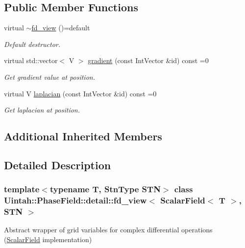 \subsection*{Public Member Functions}
\begin{DoxyCompactItemize}
\item 
virtual \hyperlink{classUintah_1_1PhaseField_1_1detail_1_1fd__view_3_01ScalarField_3_01T_01_4_00_01STN_01_4_ae0c8252279c942f0732dd858662f045f}{$\sim$fd\+\_\+view} ()=default
\begin{DoxyCompactList}\small\item\em Default destructor. \end{DoxyCompactList}\item 
virtual std\+::vector$<$ V $>$ \hyperlink{classUintah_1_1PhaseField_1_1detail_1_1fd__view_3_01ScalarField_3_01T_01_4_00_01STN_01_4_a5f8aa629d4cfae6641941946ff1d8aad}{gradient} (const Int\+Vector \&id) const =0
\begin{DoxyCompactList}\small\item\em Get gradient value at position. \end{DoxyCompactList}\item 
virtual V \hyperlink{classUintah_1_1PhaseField_1_1detail_1_1fd__view_3_01ScalarField_3_01T_01_4_00_01STN_01_4_a553675ea0c01e201769674a30333d56a}{laplacian} (const Int\+Vector \&id) const =0
\begin{DoxyCompactList}\small\item\em Get laplacian at position. \end{DoxyCompactList}\end{DoxyCompactItemize}
\subsection*{Additional Inherited Members}


\subsection{Detailed Description}
\subsubsection*{template$<$typename T, Stn\+Type S\+TN$>$\newline
class Uintah\+::\+Phase\+Field\+::detail\+::fd\+\_\+view$<$ Scalar\+Field$<$ T $>$, S\+T\+N $>$}

Abstract wrapper of grid variables for complex differential operations (\hyperlink{structUintah_1_1PhaseField_1_1ScalarField}{Scalar\+Field} implementation) 

